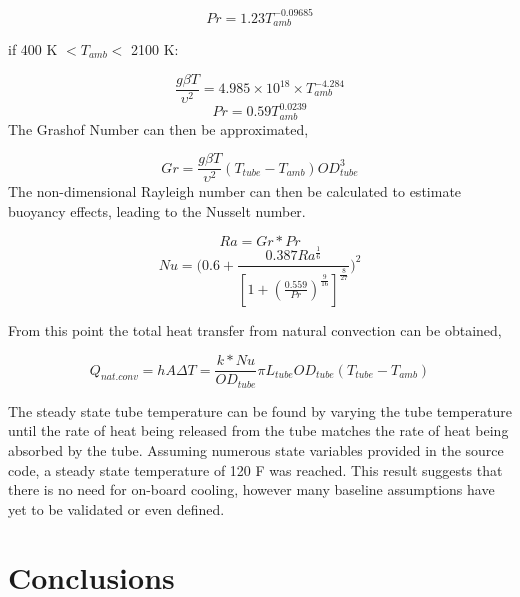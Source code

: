 \documentclass[heading.tex]{subfiles}
\begin{document}
\begin{equation}
Pr = 1.23 T_{amb}^{-0.09685}
\end{equation}

if 400 K $<  T_{amb}  <$ 2100 K:


\begin{equation}
\frac{g \beta T} {\upsilon^2}  = 4.985\times10^{18} \times T_{amb}^{-4.284}
\end{equation}
\begin{equation}
Pr = 0.59 T_{amb}^{0.0239}
\end{equation}
The Grashof Number can then be approximated,


\begin{equation}
Gr = \frac{g \beta T} {\upsilon^2}  (T_{tube}-T_{amb}) {OD}_{tube}^3
\end{equation}
The non-dimensional Rayleigh number can then be calculated to estimate buoyancy effects, leading to the Nusselt number.


\begin{equation}
Ra = Gr * Pr
\end{equation}
\begin{equation}
Nu = \Bigg(0.6 + \frac{0.387Ra^{\frac{1}{6}}}{[1+(\frac{0.559}{Pr})^{\frac{9}{16}}]^{\frac{8}{27}}}\Bigg)^2
\end{equation}

From this point the total heat transfer from natural convection can be obtained,

\begin{equation}
Q_{nat. conv} = hA \Delta T = \frac{k*Nu}{ {OD}_{tube}} \pi {L}_{tube} {OD}_{tube} (T_{tube}-T_{amb})
\end{equation}

The steady state tube temperature can be found by varying the tube temperature until the rate of heat being released from the tube
matches the rate of heat being absorbed by the tube.
Assuming numerous state variables provided in the source code, a steady state temperature of 120 F was reached.
This result suggests that there is no need for on-board cooling, however many baseline assumptions have yet to be validated or even defined.

\section{Conclusions}
\end{document}
